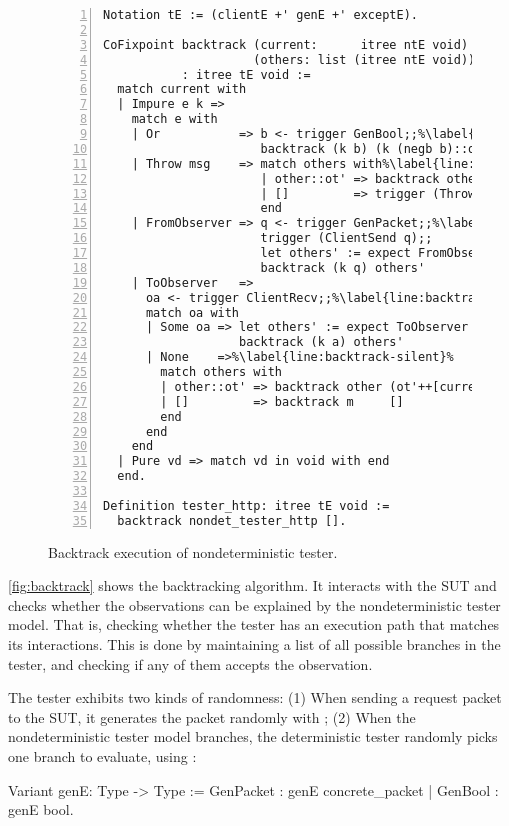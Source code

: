 \begin{figure}
\begin{lstlisting}[numbers=left]
Notation tE := (clientE +' genE +' exceptE).

CoFixpoint backtrack (current:      itree ntE void)
                     (others: list (itree ntE void))
           : itree tE void :=
  match current with
  | Impure e k =>
    match e with
    | Or           => b <- trigger GenBool;;%\label{line:backtrack-or}%
                      backtrack (k b) (k (negb b)::others)
    | Throw msg    => match others with%\label{line:backtrack-throw}%
                      | other::ot' => backtrack other ot'
                      | []         => trigger (Throw msg)
                      end
    | FromObserver => q <- trigger GenPacket;;%\label{line:backtrack-send}%
                      trigger (ClientSend q);;
                      let others' := expect FromObserver q others in
                      backtrack (k q) others'
    | ToObserver   =>
      oa <- trigger ClientRecv;;%\label{line:backtrack-recv}%
      match oa with
      | Some oa => let others' := expect ToObserver a others in
                   backtrack (k a) others'
      | None    =>%\label{line:backtrack-silent}%
        match others with
        | other::ot' => backtrack other (ot'++[current]) (* postpone *)%\label{line:backtrack-postpone}%
        | []         => backtrack m     []               (* retry    *)
        end
      end
    end
  | Pure vd => match vd in void with end
  end.

Definition tester_http: itree tE void :=
  backtrack nondet_tester_http [].
\end{lstlisting}
\caption{Backtrack execution of nondeterministic tester.}
\label{fig:backtrack}
\end{figure}

\autoref{fig:backtrack} shows the backtracking algorithm.  It interacts with the
SUT and checks whether the observations can be explained by the nondeterministic
tester model.  That is, checking whether the tester has an execution path that
matches its interactions.  This is done by maintaining a list of all possible
branches in the tester, and checking if any of them accepts the observation.

The tester exhibits two kinds of randomness: (1) When sending a request packet
to the SUT, it generates the packet randomly with ; (2) When the
nondeterministic tester model branches, the deterministic tester randomly picks
one branch to evaluate, using :
\begin{coq}
  Variant genE: Type -> Type :=
    GenPacket : genE concrete_packet
  | GenBool   : genE bool.
\end{coq}

